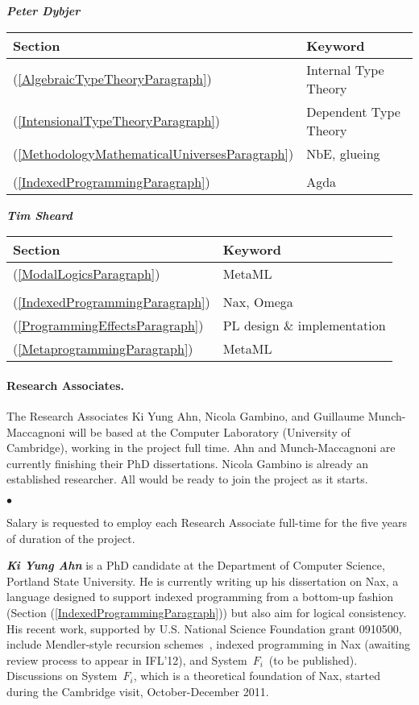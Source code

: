 \documentclass[11pt,twocolumn]{article}
\newenvironment{myitemize}
  {\begin{list}{$\bullet$}
  {\setlength{\topsep}{2pt}
   \setlength{\partopsep}{2pt}
   \setlength{\itemsep}{2.5pt}
   \setlength{\parsep}{2.5pt}
   \setlength{\leftmargin}{1em}
   \setlength{\labelwidth}{.5em}}}
  {\end{list}}
\newcommand{\SystemFi}{\mbox{System~$F_i$}}
\begin{document}
\smallskip\noindent
\textbf{\em Peter Dybjer}

\begin{tabular}{l|l}
Section & Keyword
\\\hline
(\ref{AlgebraicTypeTheoryParagraph}) & Internal Type Theory
\\
(\ref{IntensionalTypeTheoryParagraph}) & Dependent Type Theory
\\
(\ref{MethodologyMathematicalUniversesParagraph}) & NbE, glueing
\\
\\
(\ref{IndexedProgrammingParagraph}) & Agda
\\
\end{tabular}

\smallskip\noindent
\textbf{\em Tim Sheard}

\begin{tabular}{l|l}
Section & Keyword
\\\hline
(\ref{ModalLogicsParagraph}) & MetaML
\\
\\
(\ref{IndexedProgrammingParagraph}) & Nax, Omega
\\
(\ref{ProgrammingEffectsParagraph}) & PL design \& implementation
\\
(\ref{MetaprogrammingParagraph}) & MetaML
\\
\end{tabular}

\paragraph*{Research Associates.}

The Research Associates Ki Yung Ahn, Nicola Gambino, and Guillaume
Munch-Maccagnoni will be based at the Computer Laboratory (University of
Cambridge), working in the project full time.  Ahn and Munch-Maccagnoni
are currently finishing their PhD dissertations.  Nicola Gambino is
already an established researcher.  All would be ready to join the project
as it starts.  
\begin{myitemize}
\item 
  Salary is requested to employ each Research Associate full-time for the five
  years of duration of the project.
\end{myitemize}

\smallskip\noindent
\textbf{\em Ki Yung Ahn}
is a PhD candidate at the Department of Computer Science,
Portland State University. He is currently writing up his dissertation on Nax,
a language designed to support indexed programming from a bottom-up fashion 
(Section (\ref{IndexedProgrammingParagraph})) but also aim for logical
consistency. His recent work, supported by U.S. National Science Foundation
grant 0910500, include Mendler-style recursion schemes~\cite{AhnSheard11},
indexed programming in Nax (awaiting review process to appear in IFL'12),
and \SystemFi\ (to be published).
Discussions on \SystemFi, which is a theoretical foundation of Nax,
started during the Cambridge visit, October-December 2011.
\end{document}
